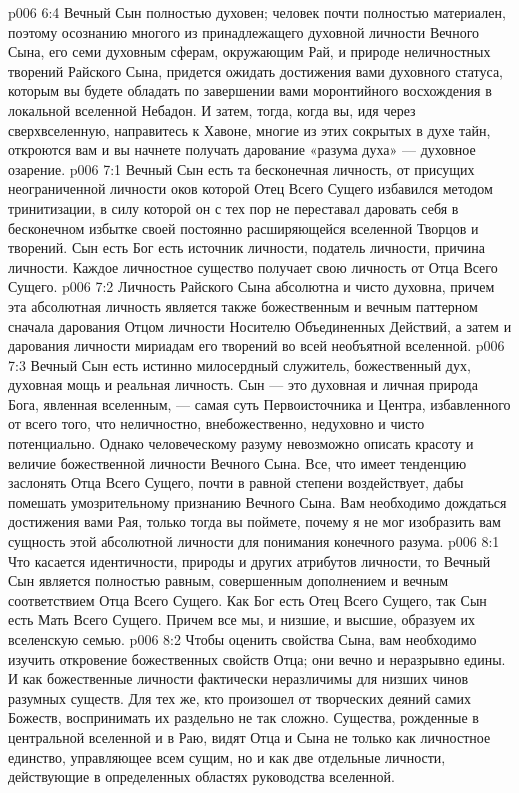 \vs p006 6:4 Вечный Сын полностью духовен; человек почти полностью материален, поэтому осознанию многого из принадлежащего духовной личности Вечного Сына, его семи духовным сферам, окружающим Рай, и природе неличностных творений Райского Сына, придется ожидать достижения вами духовного статуса, которым вы будете обладать по завершении вами моронтийного восхождения в локальной вселенной Небадон. И затем, тогда, когда вы, идя через сверхвселенную, направитесь к Хавоне, многие из этих сокрытых в духе тайн, откроются вам и вы начнете получать дарование «разума духа» --- духовное озарение.
\vs p006 7:1 Вечный Сын есть та бесконечная личность, от присущих неограниченной личности оков которой Отец Всего Сущего избавился методом тринитизации, в силу которой он с тех пор не переставал даровать себя в бесконечном избытке своей постоянно расширяющейся вселенной Творцов и творений. Сын есть  Бог есть  источник личности, податель личности, причина личности. Каждое личностное существо получает свою личность от Отца Всего Сущего.
\vs p006 7:2 Личность Райского Сына абсолютна и чисто духовна, причем эта абсолютная личность является также божественным и вечным паттерном сначала дарования Отцом личности Носителю Объединенных Действий, а затем и дарования личности мириадам его творений во всей необъятной вселенной.
\vs p006 7:3 Вечный Сын есть истинно милосердный служитель, божественный дух, духовная мощь и реальная личность. Сын --- это духовная и личная природа Бога, явленная вселенным, --- самая суть Первоисточника и Центра, избавленного от всего того, что неличностно, внебожественно, недуховно и чисто потенциально. Однако человеческому разуму невозможно описать красоту и величие божественной личности Вечного Сына. Все, что имеет тенденцию заслонять Отца Всего Сущего, почти в равной степени воздействует, дабы помешать умозрительному признанию Вечного Сына. Вам необходимо дождаться достижения вами Рая, только тогда вы поймете, почему я не мог изобразить вам сущность этой абсолютной личности для понимания конечного разума.
\vs p006 8:1 Что касается идентичности, природы и других атрибутов личности, то Вечный Сын является полностью равным, совершенным дополнением и вечным соответствием Отца Всего Сущего. Как Бог есть Отец Всего Сущего, так Сын есть Мать Всего Сущего. Причем все мы, и низшие, и высшие, образуем их вселенскую семью.
\vs p006 8:2 Чтобы оценить свойства Сына, вам необходимо изучить откровение божественных свойств Отца; они вечно и неразрывно едины. И как божественные личности фактически неразличимы для низших чинов разумных существ. Для тех же, кто произошел от творческих деяний самих Божеств, воспринимать их раздельно не так сложно. Существа, рожденные в центральной вселенной и в Раю, видят Отца и Сына не только как личностное единство, управляющее всем сущим, но и как две отдельные личности, действующие в определенных областях руководства вселенной.
